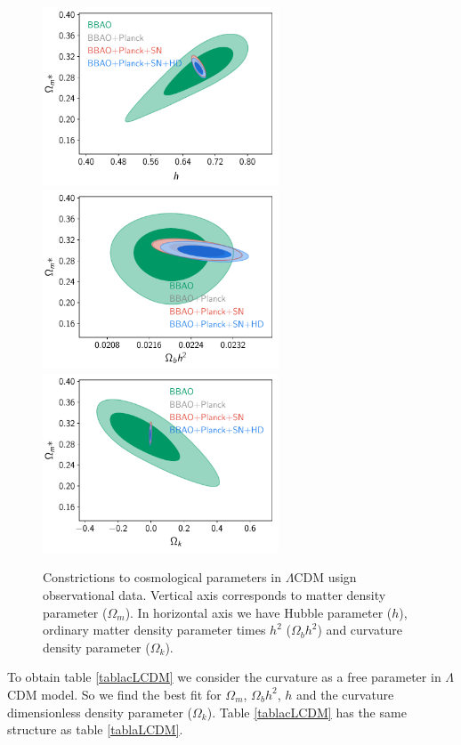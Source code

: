 \documentclass[onecolumn,           %
               showpacs,            %
               preprintnumbers,     %
               aps,                 %
               letterpaper,             %
               superscriptaddress,      %
               nofootinbib,         %
               tightenlines,        %
               floats,floatfix      %
               ,usenatbib,
               ]{revtex4-1}
\begin{document}
\begin{figure}[htp]
	\centering
	\includegraphics[width=7cm]{FiguresCosmo/h_Om_cLCDM_todas.pdf}	
	\includegraphics[width=7cm]{FiguresCosmo/Obh2_Om_cLCDM_todas.pdf}
	\includegraphics[width=7cm]{FiguresCosmo/Ok_Om_cLCDM_todas.pdf}
	\caption{Constrictions to cosmological parameters in $\Lambda$CDM usign observational data. Vertical axis corresponds to matter density parameter ($\Omega_m$). In horizontal axis we have Hubble parameter ($h$), ordinary matter density parameter times $h^2$ ($\Omega_b h^2$) and curvature density parameter ($\Omega_k$).}
	\label{cLCDM}
\end{figure}
To obtain table \ref{tablacLCDM} we consider the curvature as a free parameter in $\Lambda$CDM model. So we find the best fit for $\Omega_m$, $\Omega_b h^2$, $h$ and the curvature dimensionless density parameter ($\Omega_k$). Table \ref{tablacLCDM} has the same structure as table \ref{tablaLCDM}.
\end{document}
